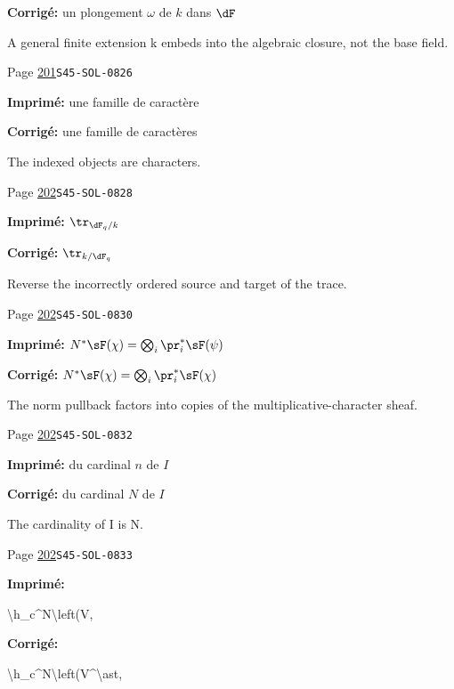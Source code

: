 \begin{description}
\par\noindent\textbf{Corrigé:} un plongement $\omega$ de $k$ dans $\dF$
\par\noindent A general finite extension k embeds into the algebraic closure, not the base field.
\smallskip
\item[\hypertarget{apparatus:FR-0183}{183}] Page \hyperlink{printpage:fr:201}{201}\quad\texttt{S45-SOL-0826}
\par\noindent\textbf{Imprimé:} une famille de caractère
\par\noindent\textbf{Corrigé:} une famille de caractères
\par\noindent The indexed objects are characters.
\smallskip
\item[\hypertarget{apparatus:FR-0184}{184}] Page \hyperlink{printpage:fr:202}{202}\quad\texttt{S45-SOL-0828}
\par\noindent\textbf{Imprimé:} \(\tr_{\dF_q/k}\)
\par\noindent\textbf{Corrigé:} \(\tr_{k/\dF_q}\)
\par\noindent Reverse the incorrectly ordered source and target of the trace.
\smallskip
\item[\hypertarget{apparatus:FR-0185}{185}] Page \hyperlink{printpage:fr:202}{202}\quad\texttt{S45-SOL-0830}
\par\noindent\textbf{Imprimé:} \(N^\ast\sF(\chi) = \bigotimes_i \pr_i^\ast\sF(\psi)\)
\par\noindent\textbf{Corrigé:} \(N^\ast\sF(\chi) = \bigotimes_i \pr_i^\ast\sF(\chi)\)
\par\noindent The norm pullback factors into copies of the multiplicative-character sheaf.
\smallskip
\item[\hypertarget{apparatus:FR-0186}{186}] Page \hyperlink{printpage:fr:202}{202}\quad\texttt{S45-SOL-0832}
\par\noindent\textbf{Imprimé:} du cardinal $n$ de $I$
\par\noindent\textbf{Corrigé:} du cardinal $N$ de $I$
\par\noindent The cardinality of I is N.
\smallskip
\item[\hypertarget{apparatus:FR-0187}{187}] Page \hyperlink{printpage:fr:202}{202}\quad\texttt{S45-SOL-0833}
\par\noindent\textbf{Imprimé:} {\footnotesize\ttfamily\raggedright \textbackslash{}\allowbreak{}h\_\allowbreak{}c\textasciicircum{}\allowbreak{}N\textbackslash{}\allowbreak{}left(\allowbreak{}V,\allowbreak{}}
\par\noindent\textbf{Corrigé:} {\footnotesize\ttfamily\raggedright \textbackslash{}\allowbreak{}h\_\allowbreak{}c\textasciicircum{}\allowbreak{}N\textbackslash{}\allowbreak{}left(\allowbreak{}V\textasciicircum{}\allowbreak{}\textbackslash{}\allowbreak{}ast,\allowbreak{}}

\end{description}
